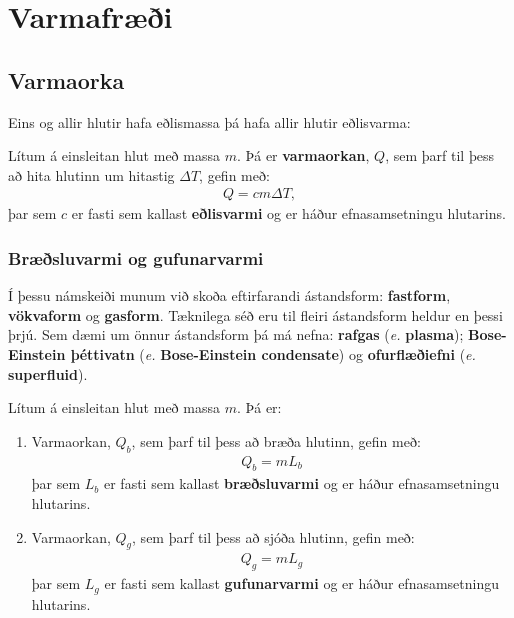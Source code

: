 
\chapter{Varmafræði}

\section{Varmaorka}

Eins og allir hlutir hafa eðlismassa þá hafa allir hlutir eðlisvarma:

\begin{tcolorbox}
\begin{definition}
Lítum á einsleitan hlut með massa $m$. Þá er \textbf{varmaorkan}, $Q$, sem þarf til þess að hita hlutinn um hitastig $\Delta T$, gefin með:
\begin{align*}
    Q = cm\Delta T,
\end{align*}
þar sem $c$ er fasti sem kallast \textbf{eðlisvarmi} og er háður efnasamsetningu hlutarins.
\end{definition}
\end{tcolorbox}

\subsection{Bræðsluvarmi og gufunarvarmi}

Í þessu námskeiði munum við skoða eftirfarandi ástandsform: \textbf{fastform}, \textbf{vökvaform} og \textbf{gasform}. Tæknilega séð eru til fleiri ástandsform heldur en þessi þrjú. Sem dæmi um önnur ástandsform þá má nefna: \textbf{rafgas} (\emph{e.} \textbf{plasma}); \textbf{Bose-Einstein þéttivatn} (\emph{e.} \textbf{Bose-Einstein condensate}) og \textbf{ofurflæðiefni} (\emph{e.} \textbf{superfluid}).

\begin{tcolorbox}
\begin{definition}
Lítum á einsleitan hlut með massa $m$. Þá er:
\begin{enumerate}[label = \textbf{(\roman*)}]
    \item Varmaorkan, $Q_b$,  sem þarf til þess að bræða hlutinn, gefin með:
\begin{align*}
    Q_b = mL_b
\end{align*}
þar sem $L_b$ er fasti sem kallast \textbf{bræðsluvarmi} og er háður efnasamsetningu hlutarins.
    \item Varmaorkan, $Q_g$,  sem þarf til þess að sjóða hlutinn, gefin með:
\begin{align*}
    Q_g = mL_g
\end{align*}
þar sem $L_g$ er fasti sem kallast \textbf{gufunarvarmi} og er háður efnasamsetningu hlutarins.
\end{enumerate}

\end{definition}
\end{tcolorbox}

